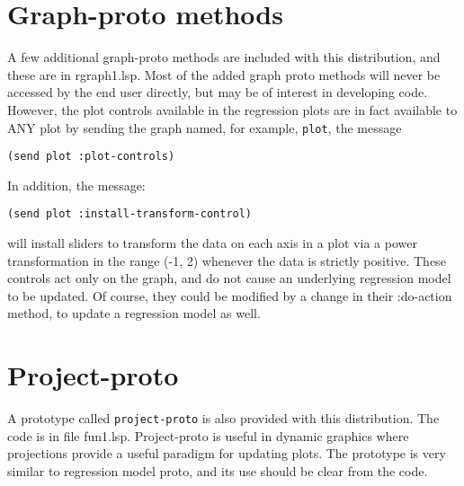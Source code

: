 \section{Graph-proto methods}
A few additional graph-proto methods are included with this distribution, and
these are in rgraph1.lsp.  Most of the added graph proto methods will
never be accessed by the end user directly, but may be of interest in
developing code.  However, the plot controls available in the
regression plots are in fact available to ANY plot by sending the graph named,
for example, {\tt plot}, the message
\begin{verbatim}
(send plot :plot-controls)
\end{verbatim}
In addition, the message:
\begin{verbatim}
(send plot :install-transform-control)
\end{verbatim}
will install sliders to transform the data on each axis in a plot via a power
transformation in the range (-1, 2) whenever the
data is strictly positive.  These controls act only on the graph, and do not
cause an underlying regression model to be updated.  Of course, they could be
modified by a change in their :do-action method, to update a regression
model as well.

\section{Project-proto}
A prototype called {\tt project-proto} 
is also provided with this distribution.  The code is in file fun1.lsp.
Project-proto is useful in dynamic graphics where projections provide a
useful paradigm for updating plots.  The prototype is very similar to
regression model proto, and its use should be clear from the code.

